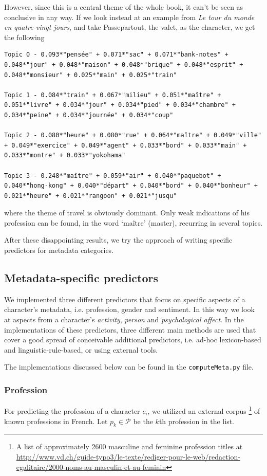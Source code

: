 However, since this is a central theme of the whole book, it can't be seen as conclusive in any way. If we look instead at an example from \textit{Le tour du monde en quatre-vingt jours}, and take Passepartout, the valet, as the character, we get the following

\begin{lstlisting}
Topic 0 - 0.093*"pensée" + 0.071*"sac" + 0.071*"bank-notes" + 0.048*"jour" + 0.048*"maison" + 0.048*"brique" + 0.048*"esprit" + 0.048*"monsieur" + 0.025*"main" + 0.025*"train"

Topic 1 - 0.084*"train" + 0.067*"milieu" + 0.051*"maître" + 0.051*"livre" + 0.034*"jour" + 0.034*"pied" + 0.034*"chambre" + 0.034*"peine" + 0.034*"journée" + 0.034*"coup"

Topic 2 - 0.080*"heure" + 0.080*"rue" + 0.064*"maître" + 0.049*"ville" + 0.049*"exercice" + 0.049*"agent" + 0.033*"bord" + 0.033*"main" + 0.033*"montre" + 0.033*"yokohama"

Topic 3 - 0.248*"maître" + 0.059*"air" + 0.040*"paquebot" + 0.040*"hong-kong" + 0.040*"départ" + 0.040*"bord" + 0.040*"bonheur" + 0.021*"heure" + 0.021*"rangoon" + 0.021*"jusqu"
\end{lstlisting}

where the theme of travel is obviously dominant. Only weak indications of his profession can be found, in the word `ma\^itre' (master), recurring in several topics. 

After these disappointing results, we try the approach of writing specific predictors for metadata categories.

\subsection{Metadata-specific predictors}
We implemented three different predictors that focus on specific aspects of a character's metadata, i.e. profession, gender and sentiment. In this way we look at aspects from a character's \textit{activity}, \textit{person} and \textit{psychological affect}. In the implementations of these predictors, three different main methods are used that cover a good spread of conceivable additional predictors, i.e. ad-hoc lexicon-based and linguistic-rule-based, or using external tools.

The implementations discussed below can be found in the \texttt{computeMeta.py} file.

\subsubsection{Profession} \label{sssec:profession}
For predicting the profession of a character $c_i$, we utilized an external corpus \footnote{A list of approximately 2600 masculine and feminine profession titles at \href{http://www.vd.ch/guide-typo3/le-texte/rediger-pour-le-web/redaction-egalitaire/2000-noms-au-masculin-et-au-feminin}{http://www.vd.ch/guide-typo3/le-texte/rediger-pour-le-web/redaction-egalitaire/2000-noms-au-masculin-et-au-feminin}} of known professions in French. Let $p_k \in \mathcal{P}$ be the $k$th  profession in the list. 

